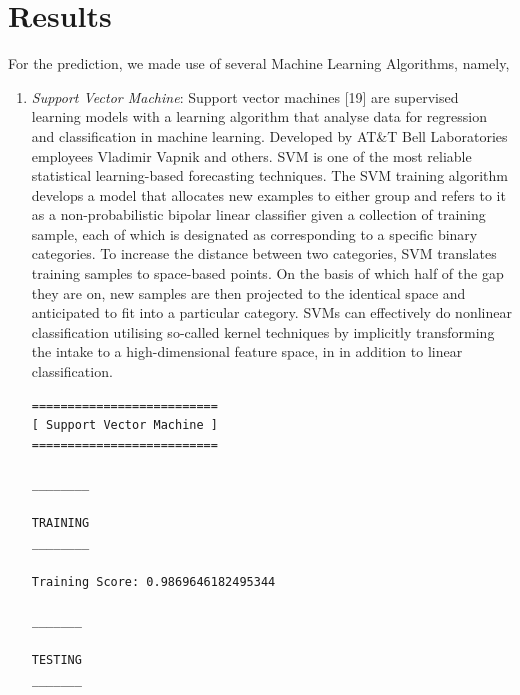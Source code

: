 \documentclass[conference]{IEEEtran}
\begin{document}
\section{Results}
For the prediction, we made use of several Machine Learning Algorithms, namely, 
\begin{enumerate}
\item \textit{Support Vector Machine}: Support vector machines [19] are supervised learning models with a learning algorithm that analyse data for regression and classification in machine learning. Developed by AT\&T Bell Laboratories employees Vladimir Vapnik and others. SVM is one of the most reliable statistical learning-based forecasting techniques. The SVM training algorithm develops a model that allocates new examples to either group and refers to it as a non-probabilistic bipolar linear classifier given a collection of training sample, each of which is designated as corresponding to a specific binary categories. To increase the distance between two categories, SVM translates training samples to space-based points. On the basis of which half of the gap they are on, new samples are then projected to the identical space and anticipated to fit into a particular category. SVMs can effectively do nonlinear classification utilising so-called kernel techniques by implicitly transforming the intake to a high-dimensional feature space, in in addition to linear classification.
\begin{verbatim}
==========================
[ Support Vector Machine ]
==========================

________

TRAINING
________

Training Score: 0.9869646182495344

_______

TESTING
_______


\end{verbatim}
\end{enumerate}
\end{document}
